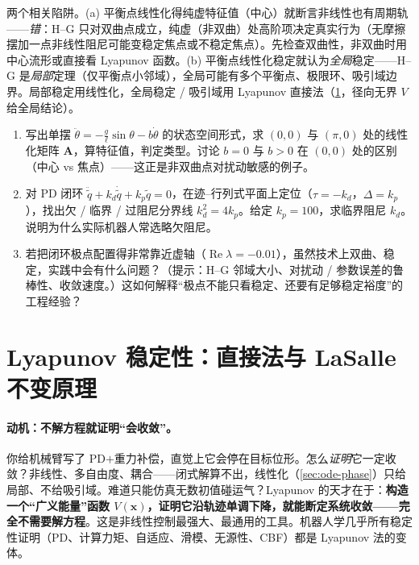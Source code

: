\begin{pitfall}
两个相关陷阱。(a) 平衡点线性化得纯虚特征值（中心）就断言非线性也有周期轨——\emph{错}：H--G 只对双曲点成立，纯虚（非双曲）处高阶项决定真实行为（无摩擦摆加一点非线性阻尼可能变稳定焦点或不稳定焦点）。先检查双曲性，非双曲时用中心流形或直接看 Lyapunov 函数。(b) 平衡点线性化稳定就认为\emph{全局}稳定——H--G 是\emph{局部}定理（仅平衡点小邻域），全局可能有多个平衡点、极限环、吸引域边界。局部稳定用线性化，全局稳定 / 吸引域用 Lyapunov 直接法（\cref{sec:ode-lyapunov}，径向无界 $V$ 给全局结论）。
\end{pitfall}

\begin{practice}
\begin{enumerate}
  \item 写出单摆 $\ddot\theta=-\frac{g}{\ell}\sin\theta-b\dot\theta$ 的状态空间形式，求 $(0,0)$ 与 $(\pi,0)$ 处的线性化矩阵 $\mathbf{A}$，算特征值，判定类型。讨论 $b=0$ 与 $b>0$ 在 $(0,0)$ 处的区别（中心 vs 焦点）——这正是非双曲点对扰动敏感的例子。
  \item 对 PD 闭环 $\ddot{\tilde q}+k_d\dot{\tilde q}+k_p\tilde q=0$，在迹--行列式平面上定位（$\tau=-k_d$，$\Delta=k_p$），找出欠 / 临界 / 过阻尼分界线 $k_d^2=4k_p$。给定 $k_p=100$，求临界阻尼 $k_d$。说明为什么实际机器人常选略欠阻尼。
  \item 若把闭环极点配置得非常靠近虚轴（$\operatorname{Re}\lambda=-0.01$），虽然技术上双曲、稳定，实践中会有什么问题？（提示：H--G 邻域大小、对扰动 / 参数误差的鲁棒性、收敛速度。）这如何解释“极点不能只看稳定、还要有足够稳定裕度”的工程经验？
\end{enumerate}
\end{practice}

\section{Lyapunov 稳定性：直接法与 LaSalle 不变原理}
\label{sec:ode-lyapunov}

\paragraph{动机：不解方程就证明“会收敛”。}
你给机械臂写了 PD$+$重力补偿，直觉上它会停在目标位形。怎么\emph{证明}它一定收敛？非线性、多自由度、耦合——闭式解算不出，线性化（\cref{sec:ode-phase}）只给局部、不给吸引域。难道只能仿真无数初值碰运气？Lyapunov 的天才在于：\textbf{构造一个“广义能量”函数 $V(\mathbf{x})$，证明它沿轨迹单调下降，就能断定系统收敛——完全不需要解方程}。这是非线性控制最强大、最通用的工具。机器人学几乎所有稳定性证明（PD、计算力矩、自适应、滑模、无源性、CBF）都是 Lyapunov 法的变体。

